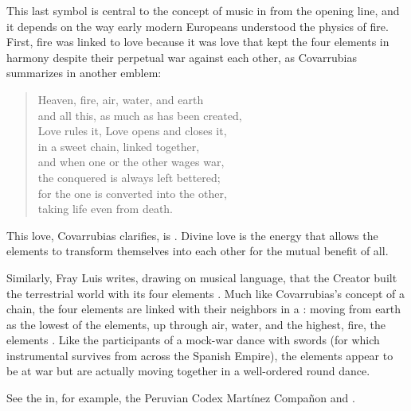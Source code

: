 
This last symbol is central to the concept of music in  from the opening line, and it depends on the way early
modern Europeans understood the physics of fire.
First, fire was linked to love because it was love that kept the four
elements in harmony despite their perpetual war against each other, as
Covarrubias summarizes in another emblem:
\begin{quoting}
    \begin{verse}
        Heaven, fire, air, water, and earth\\
        and all this, as much as has been created,\\
        Love rules it, Love opens and closes it,\\
        in a sweet chain, linked together,\\
        and when one or the other wages war,\\
        the conquered is always left bettered;\\
        for the one is converted into the other,\\
        taking life even from death.%
            \Autocite[ I, ]
            {Covarrubias:Emblemas}
    \end{verse}
\end{quoting}
This love, Covarrubias clarifies, is .
Divine love is the energy that allows the elements to transform themselves into
each other for the mutual benefit of all.


Similarly, Fray Luis writes, drawing on musical language, that the Creator
built the terrestrial world with its four elements .%
    \Autocite[204]{LuisdeGranada:Simbolo}
Much like Covarrubias's concept of a chain, the four elements are linked with
their neighbors in a : moving from
earth as the lowest of the elements, up through air, water, and the highest,
fire, the elements .
    \Autocite[204]{LuisdeGranada:Simbolo}
Like the participants of a mock-war dance with swords (for which instrumental
survives from across the Spanish Empire), the elements appear to be at war but
are actually moving together in a well-ordered round dance.%
\begin{Footnote}
    See the  in, for example, the Peruvian Codex
    Martínez Compañon and \autocite{MartinyColl:HuertoAmeno}.
\end{Footnote}

